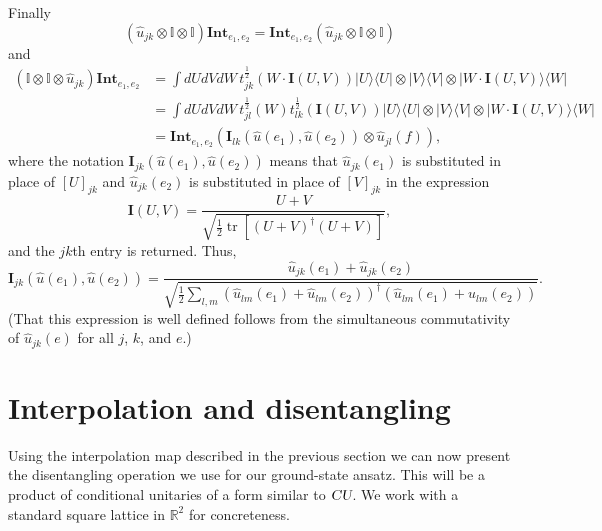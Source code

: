 \documentclass[12pt]{amsart}
\newcommand{\tr}{\operatorname{tr}}
\def\CU{\textsl{CU}}
\def\CAv{\mathbf{Int}}
\theoremstyle{definition}
\theoremstyle{remark}
\numberwithin{equation}{section}
\begin{document}
Finally
\begin{equation}
	 (\widehat{u}_{jk}\otimes \mathbb{I} \otimes \mathbb{I}) \CAv_{e_1,e_2} = \CAv_{e_1,e_2} (\widehat{u}_{jk}\otimes \mathbb{I} \otimes \mathbb{I})
\end{equation}
and
\begin{equation}
	\begin{split}
	 ( \mathbb{I} \otimes \mathbb{I}\otimes \widehat{u}_{jk}) \CAv_{e_1,e_2} &= \int dUdVdW \, t_{jk}^{\frac12}(W \cdot \mathbf{I}(U,V))|U\rangle\langle U| \otimes  |V\rangle\langle V| \otimes |W \cdot \mathbf{I}(U,V)\rangle \langle W| \\ 
	 &=  \int dUdVdW \, t_{jl}^{\frac12}(W)  t_{lk}^{\frac12}(\mathbf{I}(U,V))|U\rangle\langle U| \otimes  |V\rangle\langle V| \otimes |W \cdot \mathbf{I}(U,V)\rangle \langle W| \\
	  &=  \CAv_{e_1,e_2} (\mathbf{I}_{lk}(\widehat{u}(e_1), \widehat{u}(e_2))\otimes \widehat{u}_{jl}(f)),
	 \end{split}
\end{equation}
where the notation $\mathbf{I}_{jk}(\widehat{u}(e_1), \widehat{u}(e_2))$ means that $\widehat{u}_{jk}(e_1)$ is substituted in place of $[U]_{jk}$ and $\widehat{u}_{jk}(e_2)$ is substituted in place of $[V]_{jk}$ in the expression
\begin{equation}
	\mathbf{I}(U,V) = \frac{U+V}{\sqrt{\frac12\tr\left[(U+V)^\dag (U+V)\right]}},
\end{equation}
and the $jk$th entry is returned. Thus,
\begin{equation}
	\mathbf{I}_{jk}(\widehat{u}(e_1), \widehat{u}(e_2)) = \frac{\widehat{u}_{jk}(e_1)+\widehat{u}_{jk}(e_2)}{\sqrt{\frac12\sum_{l,m} (\widehat{u}_{lm}(e_1)+\widehat{u}_{lm}(e_2))^\dag(\widehat{u}_{lm}(e_1)+\widehat{u}_{lm}(e_2))}}.
\end{equation}
(That this expression is well defined follows from the simultaneous commutativity of $\widehat{u}_{jk}(e)$ for all $j$, $k$, and $e$.)



\section{Interpolation and disentangling}
Using the interpolation map described in the previous section we can now present the disentangling operation we use for our ground-state ansatz. This will be a product of conditional unitaries of a form similar to $\CU$. We work with a standard square lattice in $\mathbb{R}^2$ for concreteness.
\end{document}
